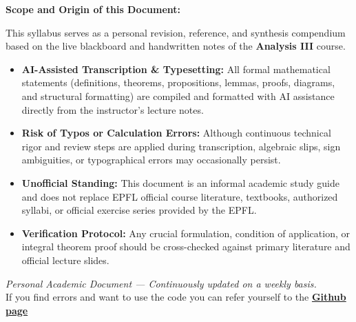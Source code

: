 
\thispagestyle{empty}
\vspace*{2cm}

\begin{tcolorbox}[
    enhanced,
    colback=OrangeRed!5!white,
    colframe=OrangeRed!85!black,
    arc=3mm,
    boxrule=1.5pt,
    title=\textbf{\Large\textsf{Important Notice \& Methodology}},
    coltitle=white,
    colbacktitle=OrangeRed!85!black,
    attach boxed title to top center={yshift*=-\tcboxedtitleheight/2},
    top=7mm, bottom=5mm, left=6mm, right=6mm
]
\vspace{2mm}
\noindent\textbf{Scope and Origin of this Document:}
\vspace{2mm}

This syllabus serves as a personal revision, reference, and synthesis compendium based on the live blackboard and handwritten notes of the \textbf{Analysis III} course.

\begin{itemize}[leftmargin=*, itemsep=5pt]
    \item \textbf{AI-Assisted Transcription \& Typesetting:} All formal mathematical statements (definitions, theorems, propositions, lemmas, proofs, diagrams, and structural formatting) are compiled and formatted with AI assistance directly from the instructor's lecture notes.
    \item \textbf{Risk of Typos or Calculation Errors:} Although continuous technical rigor and review steps are applied during transcription, algebraic slips, sign ambiguities, or typographical errors may occasionally persist.
    \item \textbf{Unofficial Standing:} This document is an informal academic study guide and does not replace EPFL official course literature, textbooks, authorized syllabi, or official exercise series provided by the EPFL.
    \item \textbf{Verification Protocol:} Any crucial formulation, condition of application, or integral theorem proof should be cross-checked against primary literature and official lecture slides.
\end{itemize}

\vspace{4mm}
\begin{center}
    \footnotesize\textsf{\textit{Personal Academic Document --- Continuously updated on a weekly basis.}} \\
    If you find errors and want to use the code you can refer yourself to the \textbf{\hyperlink{https://github.com/Examera1005/Analysis_III}{Github page}}
\end{center}
\end{tcolorbox}

\vfill
\clearpage